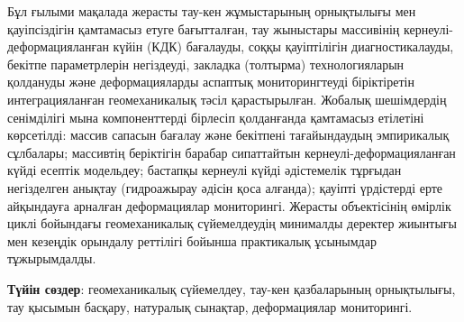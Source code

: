 Бұл ғылыми мақалада жерасты тау-кен жұмыстарының орнықтылығы мен
қауіпсіздігін қамтамасыз етуге бағытталған, тау жыныстары массивінің
кернеулі-деформацияланған күйін (КДК) бағалауды, соққы қауіптілігін
диагностикалауды, бекітпе параметрлерін негіздеуді, закладка (толтырма)
технологияларын қолдануды және деформацияларды аспаптық мониторингтеуді
біріктіретін интеграцияланған геомеханикалық тәсіл қарастырылған.
Жобалық шешімдердің сенімділігі мына компоненттерді бірлесіп қолданғанда
қамтамасыз етілетіні көрсетілді: массив сапасын бағалау және бекітпені
тағайындаудың эмпирикалық сұлбалары; массивтің беріктігін барабар
сипаттайтын кернеулі-деформацияланған күйді есептік модельдеу; бастапқы
кернеулі күйді әдістемелік тұрғыдан негізделген анықтау (гидроажырау
әдісін қоса алғанда); қауіпті үрдістерді ерте айқындауға арналған
деформациялар мониторингі. Жерасты объектісінің өмірлік циклі бойындағы
геомеханикалық сүйемелдеудің минималды деректер жиынтығы мен кезеңдік
орындалу реттілігі бойынша практикалық ұсынымдар тұжырымдалды.

{\bfseries Түйін сөздер}: геомеханикалық сүйемелдеу, тау-кен қазбаларының
орнықтылығы, тау қысымын басқару, натуралық сынақтар, деформациялар
мониторингі.

